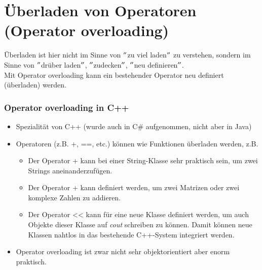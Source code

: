 
\part{Überladen von Operatoren (Operator overloading)}
\label{sec:operator overloading}
Überladen ist hier nicht im Sinne von $"$zu viel laden$"$ zu verstehen, sondern im Sinne von $"$drüber laden$"$, $"$zudecken$"$, $"$neu definieren$"$.\\
Mit Operator overloading kann ein bestehender Operator neu definiert (überladen) werden.

\section{Operator overloading in C++}
\begin{itemize}
	\item Spezialität von C++ (wurde auch in C\# aufgenommen, nicht aber in Java)
	\item Operatoren (z.B. +, ==, etc.) können wie Funktionen überladen werden, z.B.
	\begin{itemize}
		\item Der Operator + kann bei einer String-Klasse sehr praktisch sein, um zwei Strings aneinanderzufügen.
		\item Der Operator + kann definiert werden, um zwei Matrizen oder zwei komplexe Zahlen zu addieren.
		\item Der Operator << kann für eine neue Klasse definiert werden, um auch Objekte dieser Klasse auf \emph{cout} schreiben zu können. Damit können neue Klassen nahtlos in das bestehende C++-System integriert werden.
	\end{itemize}
	\item Operator overloading ist zwar nicht sehr objektorientiert aber enorm praktisch.
\end{itemize}

